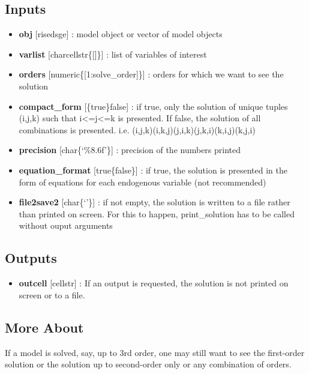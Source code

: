 \documentclass[letterpaper,10pt,english]{sphinxmanual}
\begin{document}
\subsection{Inputs}
\label{classes/models/@dsge/dsge:id136}\begin{itemize}
\item {} 
\textbf{obj} {[}rise\textbar{}dsge{]} : model object or vector of model objects

\item {} 
\textbf{varlist} {[}char\textbar{}cellstr\textbar{}\{{[}{]}\}{]} : list of variables of interest

\item {} 
\textbf{orders} {[}numeric\textbar{}\{{[}1:solve\_order{]}\}{]} : orders for which we want to
see the solution

\item {} 
\textbf{compact\_form} {[}\{true\}\textbar{}false{]} : if true, only the solution of unique
tuples (i,j,k) such that i\textless{}=j\textless{}=k is presented. If false, the solution
of all combinations is presented. i.e.
(i,j,k)(i,k,j)(j,i,k)(j,k,i)(k,i,j)(k,j,i)

\item {} 
\textbf{precision} {[}char\textbar{}\{`\%8.6f'\}{]} : precision of the numbers printed

\item {} 
\textbf{equation\_format} {[}true\textbar{}\{false\}{]} : if true, the solution is presented
in the form of equations for each endogenous variable (not recommended)

\item {} 
\textbf{file2save2} {[}char\textbar{}\{`'\}{]} : if not empty, the solution is written to a
file rather than printed on screen. For this to happen, print\_solution
has to be called without ouput arguments

\end{itemize}


\subsection{Outputs}
\label{classes/models/@dsge/dsge:id137}\begin{itemize}
\item {} 
\textbf{outcell} {[}cellstr{]} : If an output is requested, the solution is not
printed on screen or to a file.

\end{itemize}


\subsection{More About}
\label{classes/models/@dsge/dsge:id138}
If a model is solved, say, up to 3rd order, one may still want to see the
first-order solution or the solution up to second-order only or any
combination of orders.
\end{document}
